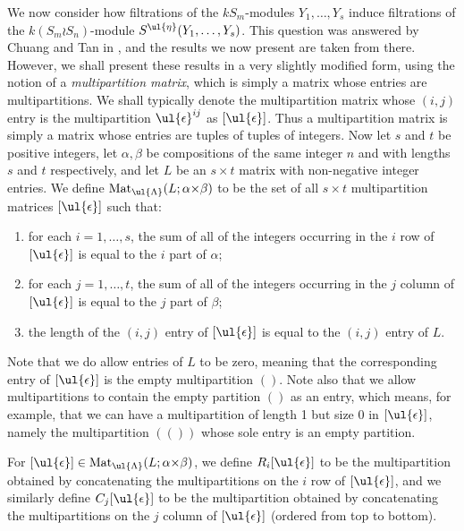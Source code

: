 We now consider how filtrations of the $kS_m$-modules $Y_1,\ldots,Y_s$ induce filtrations of the $k(S_m \wr S_n)$-module
$S^{\ul{\eta}}(Y_1,\ldots,Y_s)$. This question was answered by Chuang and Tan
in \cite{CHTAN}, and the results we now present are taken from there. However, we shall present these results in a very slightly modified
form, using the notion of a \textit{multipartition matrix}, which is simply a matrix whose entries are multipartitions. We shall typically
denote the multipartition matrix whose $(i,j)$ entry is the multipartition $\ul{\epsilon}^{ij}$ as $[\ul{\epsilon}]$. Thus a
multipartition matrix is simply a matrix whose entries are tuples of tuples of integers. Now let $s$ and $t$ be positive integers,
let $\alpha,\beta$ be compositions of the same integer $n$ and with lengths $s$ and $t$ respectively, and let $L$ be an $s{\times}t$
matrix with non-negative integer entries. We define $\mathrm{Mat}_{\ul{\Lambda}}(L;\alpha{\times}\beta)$ to be the
set of all $s{\times}t$ multipartition matrices $[\ul{\epsilon}]$ such that:
\begin{enumerate}
\item for each $i=1,\ldots,s$, the sum of all of the integers occurring in the $i$ row of $[\ul{\epsilon}]$ is equal to the
$i$ part of $\alpha$;
\item for each $j=1,\ldots,t$, the sum of all of the integers occurring in the $j$ column of $[\ul{\epsilon}]$ is equal to the
$j$ part of $\beta$;
\item the length of the $(i,j)$ entry of $[\ul{\epsilon}]$ is equal to the $(i,j)$ entry of $L$.
\end{enumerate}
Note that we do allow entries of $L$ to be zero, meaning that the corresponding entry of $[\ul{\epsilon}]$ is the empty multipartition
$()$. Note also that we allow multipartitions to contain the empty partition $()$ as an entry, which means, for example, that we can have
a multipartition of length 1 but size 0 in $[\ul{\epsilon}]$, namely the multipartition $(())$ whose sole entry is an empty partition.

For $[\ul{\epsilon}] \in \mathrm{Mat}_{\ul{\Lambda}}(L;\alpha{\times}\beta)$, we define $R_i[\ul{\epsilon}]$ to be the multipartition
obtained by concatenating the multipartitions on the $i$ row of $[\ul{\epsilon}]$, and we similarly define $C_j[\ul{\epsilon}]$
to be the multipartition obtained by concatenating the multipartitions on the $j$ column of $[\ul{\epsilon}]$ (ordered from top
to bottom).


